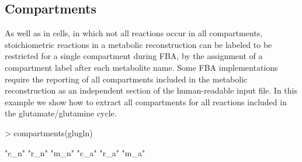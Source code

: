 \begin{Schunk}
\end{Schunk}
\subsection{Compartments}
As well as in cells, in which not all reactions occur in all compartments,  stoichiometric reactions in a metabolic reconstruction can be labeled to be restricted for a single compartment during FBA, by the assignment of  a compartment label after each metabolite name. Some FBA implementations require the reporting of all compartments included in the metabolic reconstruction as an independent section of the human-readable input file. In this example we show how to extract all compartments for all reactions included in the glutamate/glutamine cycle.
\begin{Schunk}
\begin{Sinput}
> compartments(glugln)
\end{Sinput}
\begin{Soutput}
[1] "c_n" "r_n" "m_n" "c_a" "r_a" "m_a"
\end{Soutput}
\end{Schunk}
